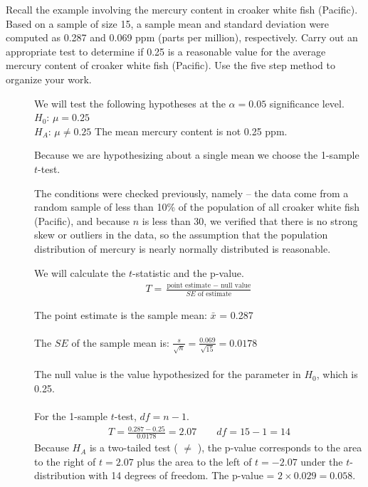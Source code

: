 \begin{examplewrap}
\begin{nexample}
{Recall the example involving the mercury content in croaker white fish (Pacific). Based on a sample of size 15, a sample mean and standard deviation were computed as 0.287 and 0.069 ppm (parts per million), respectively. Carry out an appropriate test to determine if 0.25 is a reasonable value for the average mercury content of croaker white fish (Pacific).  Use the five step method to organize your work.}

\begin{description}
\item[]  We will test the following hypotheses at the $\alpha=0.05$ significance level.\\
$H_0$: $\mu=0.25$   \\
$H_A$: $\mu \ne 0.25$ \quad The mean mercury content is not 0.25 ppm.\\
 
\item[] Because we are hypothesizing about a single mean we choose the \mbox{1-sample $t$-test.}
\item[]  The conditions were checked previously, namely -- the data come from a random sample of less than 10\% of the population of all croaker white fish (Pacific), and because $n$ is less than 30, we verified that there is no strong skew or outliers in the data, so the assumption that the population distribution of mercury is nearly normally distributed is reasonable.  
\item[  ]  We will calculate the $t$-statistic and the p-value.
\begin{align*}
T = \frac{\text{point estimate } - \text{ null value}}{SE \text{ of estimate}}
\end{align*}

The point estimate is the sample mean:  $\bar{x}$ =  0.287 \\
\\
The $SE$ of the sample mean is:  $\frac{s}{\sqrt{n}} = \frac{0.069}{\sqrt{15}} = 0.0178$\\ 
\\
The null value is the value hypothesized for the parameter in $H_0$, which is 0.25.\\
\\
For the 1-sample $t$-test, $df = n-1$.
\\
\begin{align*}
T = \frac{0.287 - 0.25}{0.0178} = 2.07 \qquad df= 15-1=14
\end{align*}
Because $H_A$ is a two-tailed test ( $\ne$ ), the p-value corresponds to the area to the right of $t=2.07$ plus the area to the left of $t=-2.07$ under the $t$-distribution with 14 degrees of freedom.  The p-value = $2\times 0.029 = 0.058$.  


\end{description}
\end{nexample}
\end{examplewrap}
